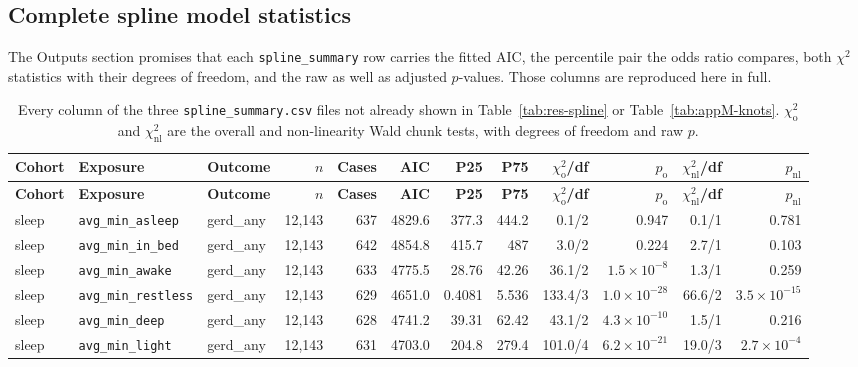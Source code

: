 \documentclass[11pt]{article}
\newcommand{\code}[1]{\texttt{\small #1}}
\begin{document}
\subsection{Complete spline model statistics}
The Outputs section promises that each \code{spline\_summary} row carries the fitted AIC, the
percentile pair the odds ratio compares, both $\chi^2$ statistics with their degrees of freedom,
and the raw as well as adjusted $p$-values. Those columns are reproduced here in full.
\footnotesize\begin{longtable}{@{}p{1.4cm}p{2.9cm}p{1.7cm}rrrr rrrr r@{}}
\caption{Every column of the three \code{spline\_summary.csv} files not already shown in Table~\ref{tab:res-spline} or Table~\ref{tab:appM-knots}. $\chi^2_{\text{o}}$ and $\chi^2_{\text{nl}}$ are the overall and non-linearity Wald chunk tests, with degrees of freedom and raw $p$.}\label{tab:appM-splinestats}\\
\toprule \textbf{Cohort} & \textbf{Exposure} & \textbf{Outcome} & \textbf{$n$} & \textbf{Cases} & \textbf{AIC} & \textbf{P25} & \textbf{P75} & \textbf{$\chi^2_{\text{o}}$/df} & \textbf{$p_{\text{o}}$} & \textbf{$\chi^2_{\text{nl}}$/df} & \textbf{$p_{\text{nl}}$} \\ \midrule \endfirsthead
\toprule \textbf{Cohort} & \textbf{Exposure} & \textbf{Outcome} & \textbf{$n$} & \textbf{Cases} & \textbf{AIC} & \textbf{P25} & \textbf{P75} & \textbf{$\chi^2_{\text{o}}$/df} & \textbf{$p_{\text{o}}$} & \textbf{$\chi^2_{\text{nl}}$/df} & \textbf{$p_{\text{nl}}$} \\ \midrule \endhead
sleep & \code{avg\_min\_asleep} & gerd\_any & 12{,}143 & 637 & 4829.6 & 377.3 & 444.2 & 0.1/2 & 0.947 & 0.1/1 & 0.781 \\
sleep & \code{avg\_min\_in\_bed} & gerd\_any & 12{,}143 & 642 & 4854.8 & 415.7 &   487 & 3.0/2 & 0.224 & 2.7/1 & 0.103 \\
sleep & \code{avg\_min\_awake} & gerd\_any & 12{,}143 & 633 & 4775.5 & 28.76 & 42.26 & 36.1/2 & $1.5\times10^{-8}$ & 1.3/1 & 0.259 \\
sleep & \code{avg\_min\_restless} & gerd\_any & 12{,}143 & 629 & 4651.0 & 0.4081 & 5.536 & 133.4/3 & $1.0\times10^{-28}$ & 66.6/2 & $3.5\times10^{-15}$ \\
sleep & \code{avg\_min\_deep} & gerd\_any & 12{,}143 & 628 & 4741.2 & 39.31 & 62.42 & 43.1/2 & $4.3\times10^{-10}$ & 1.5/1 & 0.216 \\
sleep & \code{avg\_min\_light} & gerd\_any & 12{,}143 & 631 & 4703.0 & 204.8 & 279.4 & 101.0/4 & $6.2\times10^{-21}$ & 19.0/3 & $2.7\times10^{-4}$ \\

\end{longtable}
\end{document}
